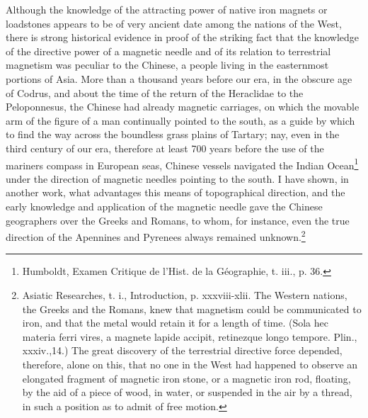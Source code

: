 Although the knowledge of the attracting power of native iron magnets or loadstones appears to be of very ancient date among the nations of the West, there is strong historical evidence in proof of the striking fact that the knowledge of the directive power of a magnetic needle and of its relation to terrestrial magnetism was peculiar to the Chinese, a people living in the easternmost portions of Asia. More than a thousand years before our era, in the obscure age of Codrus, and about the time of the return of the Heraclidae to the Peloponnesus, the Chinese had already magnetic carriages, on which the movable arm of the figure of a man continually pointed to the south, as a guide by which to find the way across the boundless grass plains of Tartary; nay, even in the third century of our era, therefore at least 700 years before the use of the mariners compass in European seas, Chinese vessels navigated the Indian Ocean\footnote{Humboldt, Examen Critique de l'Hist. de la Géographie, t. iii., p. 36.} under the direction of magnetic needles pointing to the south. I have shown, in another work, what advantages this means of topographical direction, and the early knowledge and application of the magnetic needle gave the Chinese geographers over the Greeks and Romans, to whom, for instance, even the true direction of the Apennines and Pyrenees always remained unknown.\footnote{Asiatic Researches, t. i., Introduction, p. xxxviii-xlii. The Western nations, the Greeks and the Romans, knew that magnetism could be communicated to iron, and that the metal would retain it for a length of time. (Sola hec materia ferri vires, a magnete lapide accipit, retinezque longo tempore. Plin., xxxiv.,14.) The great discovery of the terrestrial directive force depended, therefore, alone on this, that no one in the West had happened to observe an elongated fragment of magnetic iron stone, or a magnetic iron rod, floating, by the aid of a piece of wood, in water, or suspended in the air by a thread, in such a position as to admit of free motion.}

